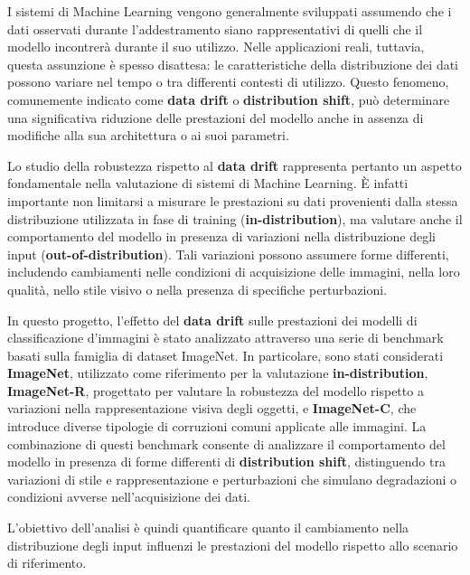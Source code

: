 I sistemi di Machine Learning vengono generalmente sviluppati assumendo che i dati osservati durante l'addestramento siano rappresentativi di quelli che il modello incontrerà durante il suo utilizzo. Nelle applicazioni reali, tuttavia, questa assunzione è spesso disattesa: le caratteristiche della distribuzione dei dati possono variare nel tempo o tra differenti contesti di utilizzo. Questo fenomeno, comunemente indicato come \textbf{data drift} o \textbf{distribution shift}, può determinare una significativa riduzione delle prestazioni del modello anche in assenza di modifiche alla sua architettura o ai suoi parametri.

Lo studio della robustezza rispetto al \textbf{data drift} rappresenta pertanto un aspetto fondamentale nella valutazione di sistemi di Machine Learning. È infatti importante non limitarsi a misurare le prestazioni su dati provenienti dalla stessa distribuzione utilizzata in fase di training (\textbf{in-distribution}), ma valutare anche il comportamento del modello in presenza di variazioni nella distribuzione degli input (\textbf{out-of-distribution}). Tali variazioni possono assumere forme differenti, includendo cambiamenti nelle condizioni di acquisizione delle immagini, nella loro qualità, nello stile visivo o nella presenza di specifiche perturbazioni.

In questo progetto, l'effetto del \textbf{data drift} sulle prestazioni dei modelli di classificazione d'immagini è stato analizzato attraverso una serie di benchmark basati sulla famiglia di dataset ImageNet. In particolare, sono stati considerati \textbf{ImageNet}, utilizzato come riferimento per la valutazione \textbf{in-distribution}, \textbf{ImageNet-R}, progettato per valutare la robustezza del modello rispetto a variazioni nella rappresentazione visiva degli oggetti, e \textbf{ImageNet-C}, che introduce diverse tipologie di corruzioni comuni applicate alle immagini. La combinazione di questi benchmark consente di analizzare il comportamento del modello in presenza di forme differenti di \textbf{distribution shift}, distinguendo tra variazioni di stile e rappresentazione e perturbazioni che simulano degradazioni o condizioni avverse nell'acquisizione dei dati.

L'obiettivo dell'analisi è quindi quantificare quanto il cambiamento nella distribuzione degli input influenzi le prestazioni del modello rispetto allo scenario di riferimento.
